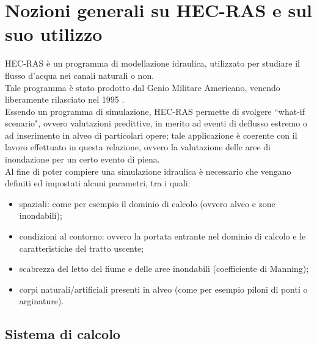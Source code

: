 \section{Nozioni generali su HEC-RAS e sul suo utilizzo}
HEC-RAS è un programma di modellazione idraulica, utilizzato per studiare il flusso d'acqua nei canali naturali o non.\\
Tale programma è stato prodotto dal Genio Militare Americano, venendo liberamente rilasciato nel 1995 \cite{hec-ras}.\\
Essendo un programma di simulazione, HEC-RAS permette di svolgere ``what-if scenario", ovvero valutazioni predittive, in merito ad eventi di deflusso estremo o ad inserimento in alveo di particolari opere; tale applicazione è coerente con il lavoro effettuato in questa relazione, ovvero la valutazione delle aree di inondazione per un certo evento di piena.\\
Al fine di poter compiere una simulazione idraulica è necessario che vengano definiti ed impostati alcuni parametri, tra i quali:
\begin{itemize}
    \item spaziali: come per esempio il dominio di calcolo (ovvero alveo e zone inondabili);
    \item condizioni al contorno: ovvero la portata entrante nel dominio di calcolo e le caratteristiche del tratto uscente;
    \item scabrezza del letto del fiume e delle aree inondabili (coefficiente di Manning);
    \item corpi naturali/artificiali presenti in alveo (come per esempio piloni di ponti o arginature).
\end{itemize}

\subsection{Sistema di calcolo}

